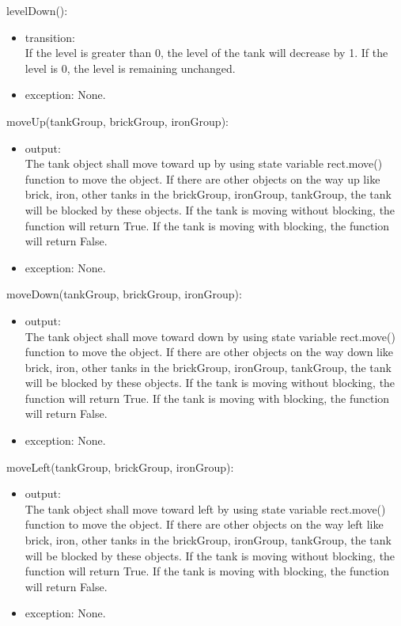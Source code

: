 \documentclass[12pt, titlepage]{article}
\begin{document}
        levelDown():
		\begin{itemize}
		\item transition: \\
		If the level is greater than 0, the level of the tank will decrease by 1. If the level is 0, the level is remaining unchanged.
		
		\item exception: None.
        \end{itemize}
        
        moveUp(tankGroup, brickGroup, ironGroup):
		\begin{itemize}
		\item output: \\
		The tank object shall move toward up by using state variable rect.move() function to move the object. If there are other objects on the way up like brick, iron, other tanks in the brickGroup, ironGroup, tankGroup, the tank will be blocked by these objects. If the tank is moving without blocking, the function will return True. If the tank is moving with blocking, the function will return False.
		
		\item exception: None.
        \end{itemize}
        
        moveDown(tankGroup, brickGroup, ironGroup):
		\begin{itemize}
		\item output: \\
		The tank object shall move toward down by using state variable rect.move() function to move the object. If there are other objects on the way down like brick, iron, other tanks in the brickGroup, ironGroup, tankGroup, the tank will be blocked by these objects. If the tank is moving without blocking, the function will return True. If the tank is moving with blocking, the function will return False.
		
		\item exception: None.
        \end{itemize}
        
        moveLeft(tankGroup, brickGroup, ironGroup):
		\begin{itemize}
		\item output: \\
		The tank object shall move toward left by using state variable rect.move() function to move the object. If there are other objects on the way left like brick, iron, other tanks in the brickGroup, ironGroup, tankGroup, the tank will be blocked by these objects. If the tank is moving without blocking, the function will return True. If the tank is moving with blocking, the function will return False.
		
		\item exception: None.
        \end{itemize}
        
\end{document}
